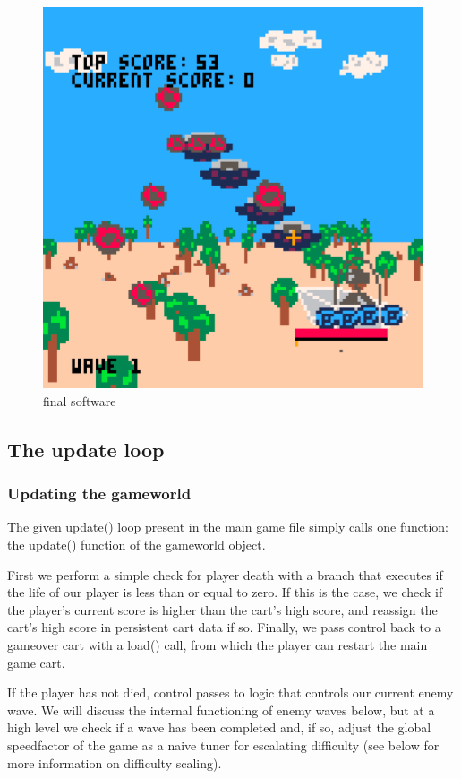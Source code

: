 \documentclass[11pt]{article}
\begin{document}
\begin{figure}[h]
    \centering
    \includegraphics[width=.8\textwidth]{final3d}
    \caption{final software}
    \label{fig:3dfinal}
\end{figure}

\subsection{The update loop}\label{update}

\subsubsection*{Updating the gameworld}
The given \textunderscore update() loop present in the main game file simply calls one
function: the update() function of the game\textunderscore world object.

First we perform a simple check for player death with a branch that executes if the
life of our player is less than or equal to zero. If this is the case, we check if
the player's current score is higher than the cart's high score, and reassign the
cart's high score in persistent cart data if so. Finally, we pass control back to
a game\textunderscore over cart with a load() call, from which the player can restart the
main game cart.

If the player has not died, control passes to logic that controls our current enemy
wave. We will discuss the internal functioning of enemy waves below, but at a high level
we check if a wave has been completed and, if so, adjust the global
speed\textunderscore factor of the game as a naive tuner for escalating difficulty
(see below for more information on difficulty scaling).
\end{document}
